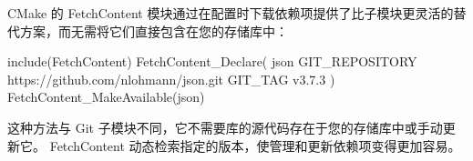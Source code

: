 
CMake 的 FetchContent 模块通过在配置时下载依赖项提供了比子模块更灵活的替代方案，而无需将它们直接包含在您的存储库中：

\begin{cmake}
include(FetchContent)
FetchContent_Declare(
    json
    GIT_REPOSITORY https://github.com/nlohmann/json.git
    GIT_TAG v3.7.3
)
FetchContent_MakeAvailable(json)
\end{cmake}

这种方法与 Git 子模块不同，它不需要库的源代码存在于您的存储库中或手动更新它。 FetchContent 动态检索指定的版本，使管理和更新依赖项变得更加容易。











